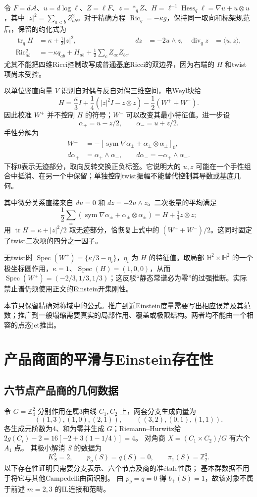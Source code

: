 \documentclass[UTF8,a4paper,11pt,fontset=fandol]{ctexart}
\numberwithin{equation}{section}
\theoremstyle{definition}
\newcommand{\Ric}{\operatorname{Ric}}
\newcommand{\tr}{\operatorname{tr}}
\newcommand{\Z}{\mathbb Z}
\begin{document}
令 $F=d\mathcal A$、$u=d\log\ell$、$Z=\ell F$、$z=*_{q}Z$、$H=\ell^{-1}\operatorname{Hess}_q\ell=\nabla u+u\otimes u$，其中 $|z|^2=\sum_{a<b}Z_{ab}^2$。对于精确方程 $\Ric_g=-\kappa g$，保持同一取向和标架规范后，保留的约化式为
\begin{align*}
\tr_q H&=\kappa+\tfrac12|z|^2,
&dz&=-2u\wedge z,&\operatorname{div}_qz&=\langle u,z\rangle,\\
\Ric^q_{ab}&=-\kappa q_{ab}+H_{ab}
+\tfrac12\sum_cZ_{ac}Z_{bc}.
\end{align*}
尤其不能把四维Ricci控制改写成普通基底Ricci的双边界，因为右端的 $H$ 和twist项尚未受控。

以单位竖直向量 $V$ 识别自对偶与反自对偶三维空间，电Weyl块给
\[
H=\frac{\kappa}{3}I+\frac14(|z|^2I-z\otimes z)
-\frac12(W^++W^-).
\]
因此校准 $W^+$ 并不控制 $H$ 的符号；$W^-$ 可以改变其最小特征值。进一步设
\[
\alpha_+=u-z/2,\qquad \alpha_-=u+z/2.
\]
手性分解为
\begin{align*}
W^\pm&=-[\operatorname{sym}\nabla\alpha_\pm+
\alpha_\pm\otimes\alpha_\pm]_0,\\
d\alpha_+&=\alpha_+\wedge\alpha_-,\qquad
d\alpha_-=-\alpha_+\wedge\alpha_-.
\end{align*}
下标0表示无迹部分，取向反转交换正负标签。它说明大的 $u,z$ 可能在一个手性组合中抵消、在另一个中保留；单独控制twist振幅不能替代控制其导数或基底几何。

其中微分关系直接来自 $du=0$ 和 $dz=-2u\wedge z$。二次张量的平均满足
\[
\frac12\sum_{\pm}
(\operatorname{sym}\nabla\alpha_\pm+\alpha_\pm\otimes\alpha_\pm)
=H+\tfrac14z\otimes z;
\]
用 $\tr H=\kappa+|z|^2/2$ 取无迹部分，恰恢复上式中的 $(W^++W^-)/2$。这同时固定了twist二次项的四分之一因子。

无twist时 $\operatorname{Spec}(W^+)=\{\kappa/3-\eta_i\}$，$\eta_i$ 为 $H$ 的特征值。取局部 $\mathbb H^2\times\mathbb H^2$ 的一个极坐标圆作用，$\kappa=1$、$\operatorname{Spec}(H)=(1,0,0)$，从而 $\operatorname{Spec}(W^+)=(-2/3,1/3,1/3)$；这反驳“静态常谱必为零”的过强推断。实际禁止谱仍须使用正文的Einstein开集刚性。

本节只保留精确对称域中的公式。推广到近Einstein度量需要写出相应误差及其范数；推广到一般塌缩需要真实的局部作用、覆盖或极限结构。两者均不能由一个相容的点态jet推出。

\section{产品商面的平滑与Einstein存在性}
\subsection{六节点产品商的几何数据}
令 $G=\Z_4^2$ 分别作用在属3曲线 $C_1,C_2$ 上，两套分支生成向量为
\[
((1,3),(1,0),(2,1)),\qquad ((3,2),(0,1),(1,1)).
\]
各生成元阶数为4、和为零并生成 $G$；Riemann--Hurwitz给
$2g(C_i)-2=16[-2+3(1-1/4)]=4$。
对角商 $X=(C_1\times C_2)/G$ 有六个 $A_1$ 点。
其极小解消 $S$ 的数据为
\[
K_S^2=2,\qquad p_g(S)=q(S)=0,\qquad \pi_1(S)=\Z_2^3.
\]
以下存在性证明只需要分支表示、六个节点及商的准\'etale性质；
基本群数据不用于将它与其他Campedelli曲面识别。
由 $p_g=q=0$ 得 $b_+(S)=1$，故该对象不属于前述 $m=2,3$ 的IL连接和范畴。
\end{document}
